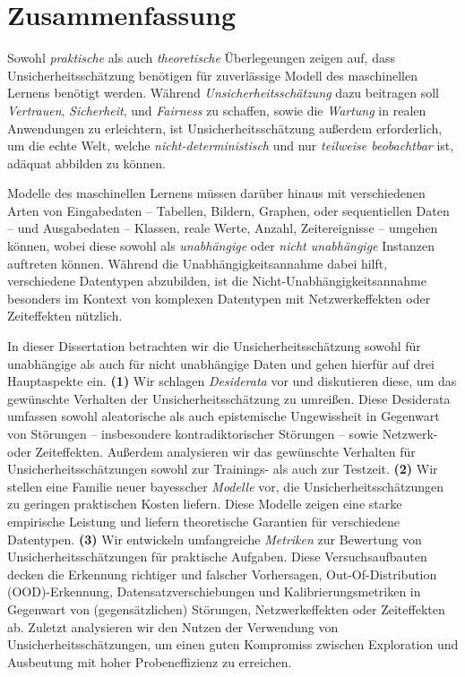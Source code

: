 \chapter*{Zusammenfassung}
%

Sowohl \emph{praktische} als auch \emph{theoretische} Überlegeungen zeigen auf, dass Unsicherheitsschätzung benötigen für zuverlässige Modell des maschinellen Lernens benötigt werden. Während \emph{Unsicherheitsschätzung} dazu beitragen soll \emph{Vertrauen}, \emph{Sicherheit}, und \emph{Fairness} zu schaffen, sowie die \emph{Wartung} in realen Anwendungen zu erleichtern, ist Unsicherheitsschätzung außerdem erforderlich, um die echte Welt, welche \emph{nicht-deterministisch} und nur \emph{teilweise beobachtbar} ist, adäquat abbilden zu können.

Modelle des maschinellen Lernens müssen darüber hinaus mit verschiedenen Arten von Eingabedaten -- Tabellen, Bildern, Graphen, oder sequentiellen Daten -- und Ausgabedaten -- Klassen, reale Werte, Anzahl, Zeitereignisse -- umgehen können, wobei diese sowohl als \emph{unabhängige} oder \emph{nicht unabhängige} Instanzen auftreten können. Während die Unabhängigkeitsannahme dabei hilft, verschiedene Datentypen abzubilden, ist die Nicht-Unabhängigkeitsannahme besonders im Kontext von komplexen Datentypen mit Netzwerkeffekten oder Zeiteffekten nützlich.

In dieser Dissertation betrachten wir die Unsicherheitsschätzung sowohl für unabhängige als auch für nicht unabhängige Daten und gehen hierfür auf drei Hauptaspekte ein. \textbf{(1)} Wir schlagen \emph{Desiderata} vor und diskutieren diese, um das gewünschte Verhalten der Unsicherheitsschätzung zu umreißen. Diese Desiderata umfassen sowohl aleatorische als auch epistemische Ungewissheit in Gegenwart von Störungen -- insbesondere kontradiktorischer Störungen -- sowie Netzwerk- oder Zeiteffekten. Außerdem analysieren wir das gewünschte Verhalten für Unsicherheitsschätzungen sowohl zur Trainings- als auch zur Testzeit. \textbf{(2)} Wir stellen eine Familie neuer bayesscher \emph{Modelle} vor, die Unsicherheitsschätzungen zu geringen praktischen Kosten liefern. Diese Modelle zeigen eine starke empirische Leistung und liefern theoretische Garantien für verschiedene Datentypen. \textbf{(3)} Wir entwickeln umfangreiche \emph{Metriken} zur Bewertung von Unsicherheitsschätzungen für praktische Aufgaben. Diese Versuchsaufbauten decken die Erkennung richtiger und falscher Vorhersagen, Out-Of-Distribution (OOD)-Erkennung, Datensatzverschiebungen und Kalibrierungsmetriken in Gegenwart von (gegensätzlichen) Störungen, Netzwerkeffekten oder Zeiteffekten ab. Zuletzt analysieren wir den Nutzen der Verwendung von Unsicherheitsschätzungen, um einen guten Kompromiss zwischen Exploration und Ausbeutung mit hoher Probeneffizienz zu erreichen.